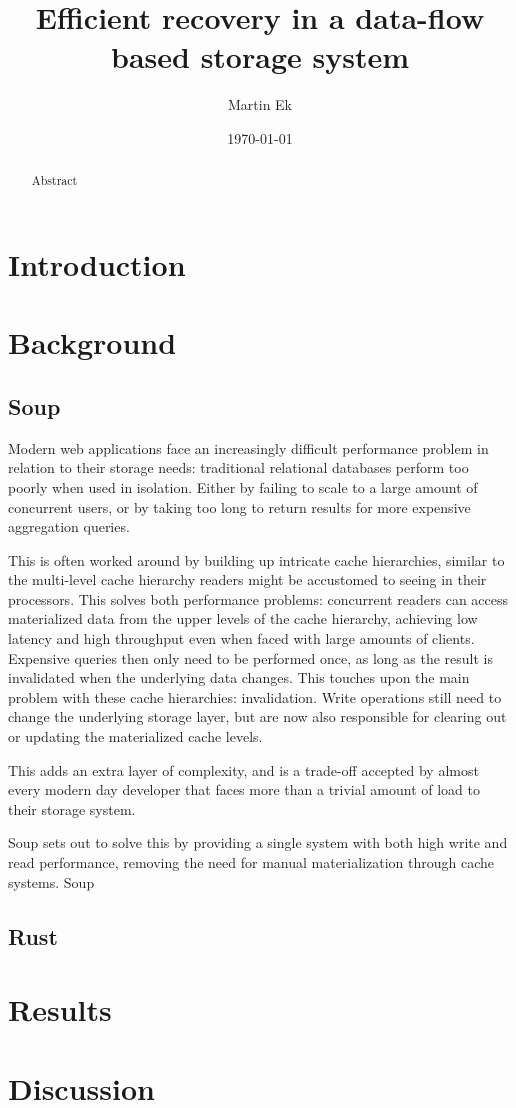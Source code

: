 \documentclass{article}
\begin{document}
\title{Efficient recovery in a data-flow based storage system}
\author{Martin Ek}
\date{\today}
\maketitle



\begin{abstract}
  Abstract
\end{abstract}

\section{Introduction}

\tableofcontents

\section{Background}
\subsection{Soup}
Modern web applications face an increasingly difficult performance problem in
relation to their storage needs: traditional relational databases perform too
poorly when used in isolation. Either by failing to scale to a large amount of
concurrent users, or by taking too long to return results for more expensive
aggregation queries.

This is often worked around by building up intricate cache hierarchies, similar
to the multi-level cache hierarchy readers might be accustomed to seeing in
their processors. This solves both performance problems: concurrent readers can
access materialized data from the upper levels of the cache hierarchy, achieving
low latency and high throughput even when faced with large amounts of clients.
Expensive queries then only need to be performed once, as long as the result is
invalidated when the underlying data changes. This touches upon the main problem
with these cache hierarchies: invalidation. Write operations still need to change
the underlying storage layer, but are now also responsible for clearing out or
updating the materialized cache levels.

This adds an extra layer of complexity, and is a trade-off accepted by almost
every modern day developer that faces more than a trivial amount of load to
their storage system.

Soup sets out to solve this by providing a single system with both high write
and read performance, removing the need for manual materialization through cache
systems. Soup

\subsection{Rust}

\section{Results}
\section{Discussion}



\end{document}
